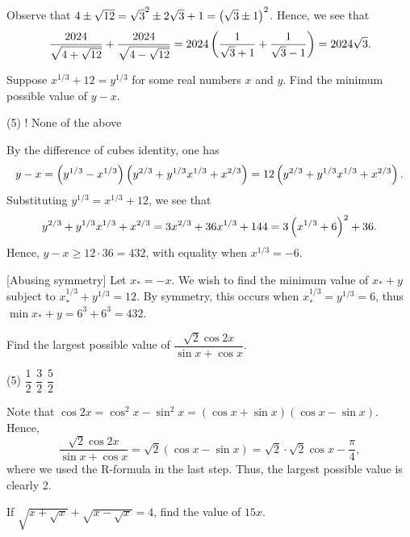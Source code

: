 Observe that $4 \pm \sqrt{12} = \sqrt{3}^2 \pm 2\sqrt{3} + 1 = \left( \sqrt{3} \pm 1 \right)^2$. Hence, we see that \[\frac{2024}{\sqrt{4 + \sqrt{12}}} + \dfrac{2024}{\sqrt{4 - \sqrt{12}}} = 2024 \left( \frac1{\sqrt{3} + 1} + \frac1{\sqrt3 - 1} \right) = 2024\sqrt{3}.\]

\begin{question}[A]\label{A::2024-S-1-4}
    Suppose $x^{1/3} + 12 = y^{1/3}$ for some real numbers $x$ and $y$. Find the minimum possible value of $y-x$.

    \begin{tasks}(5)
        \task! None of the above
    \end{tasks}
\end{question}

 By the difference of cubes identity, one has \[y - x = \left( y^{1/3} - x^{1/3} \right)\left( y^{2/3} + y^{1/3}x^{1/3} + x^{2/3} \right) = 12\left( y^{2/3} + y^{1/3}x^{1/3} + x^{2/3} \right).\] Substituting $y^{1/3} = x^{1/3} + 12$, we see that \[y^{2/3} + y^{1/3}x^{1/3} + x^{2/3} = 3x^{2/3} + 36x^{1/3} + 144 = 3\left( x^{1/3} + 6 \right)^2 + 36.\] Hence, $y - x \geq 12 \cdot 36 = 432$, with equality when $x^{1/3} = -6$.

[Abusing symmetry] Let $x_\ast = -x$. We wish to find the minimum value of $x_\ast + y$ subject to $x_\ast^{1/3} + y^{1/3} = 12$. By symmetry, this occurs when $x_\ast^{1/3} = y^{1/3} = 6$, thus $\min x_\ast + y = 6^3 + 6^3 = 432$.

\begin{question}[D]\label{A::2024-S-1-5}
    Find the largest possible value of $\dfrac{\sqrt2 \cos{2x}}{\sin{x} + \cos{x}}$.

    \begin{tasks}(5)
        \task $\dfrac12$
        \task $\dfrac32$
        \task $\dfrac52$
    \end{tasks}
\end{question}

Note that $\cos{2x} = \cos^2 x - \sin^2 x = (\cos x + \sin x)(\cos x - \sin x)$. Hence, \[\dfrac{\sqrt2 \cos{2x}}{\sin{x} + \cos{x}} = \sqrt{2} (\cos x - \sin x) = \sqrt2 \cdot \sqrt2 \cos{x - \frac{\pi}4},\] where we used the R-formula in the last step. Thus, the largest possible value is clearly 2.

\begin{question}[64]\label{A::2024-S-1-6}
    If $\sqrt{x + \sqrt{x}} + \sqrt{x - \sqrt{x}} = 4$, find the value of $15x$.
\end{question}

